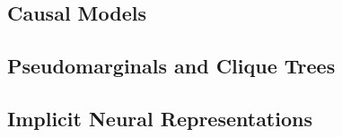\subsection{Causal Models}
    \label{ssec:capture-causal-models}


\subsection{Pseudomarginals and Clique Trees}

\subsection{Implicit Neural Representations}


